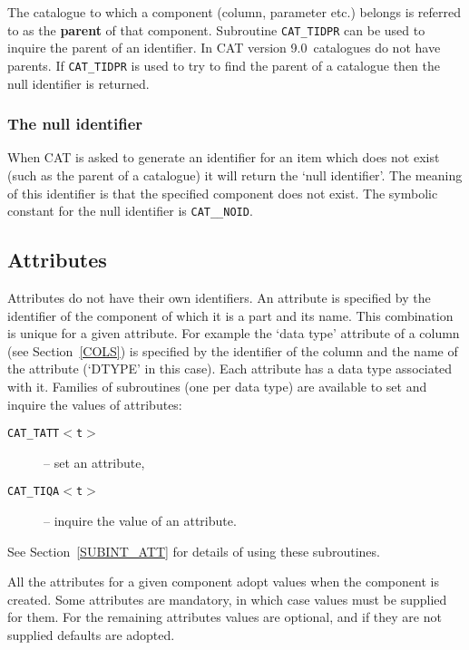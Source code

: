 \documentclass[11pt,twoside]{starlink}
\providecommand{\CATversion}{9.0~}
\begin{document}
The catalogue to which a component (column, parameter etc.) belongs is
referred to as the \textbf{parent} of that component. Subroutine \texttt{CAT\_TIDPR} can be used to inquire the parent of an identifier. In
CAT version \CATversion catalogues do not have parents. If \texttt{CAT\_TIDPR} is used to try to find the parent of a catalogue then the
null identifier is returned.

\subsubsection{The null identifier}

When CAT is asked to generate an identifier for an item which does not
exist (such as the parent of a catalogue) it will return the `null
identifier'. The meaning of this identifier is that the specified
component does not exist. The symbolic constant for the null identifier
is \texttt{CAT\_\_NOID}.


\subsection{Attributes}

Attributes do not have their own identifiers. An attribute is
specified by the identifier of the component of which it is a part and
its name. This combination is unique for a given attribute. For example
the `data type' attribute of a column (see Section~\ref{COLS}) is
specified by the identifier of the column and the name of the attribute
(`DTYPE' in this case). Each attribute has a data type associated with
it. Families of subroutines (one per data type) are available to set
and inquire the values of attributes:

\begin{description}

  \item[\texttt{CAT\_TATT$<$t$>$}] -- set an attribute,

  \item[\texttt{CAT\_TIQA$<$t$>$} ] -- inquire the value of an attribute.

\end{description}

See Section~\ref{SUBINT_ATT} for details of using these subroutines.

All the attributes for a given component adopt values when the component
is created. Some attributes are mandatory, in which case values must
be supplied for them. For the remaining attributes values are optional,
and if they are not supplied defaults are adopted.
\end{document}
